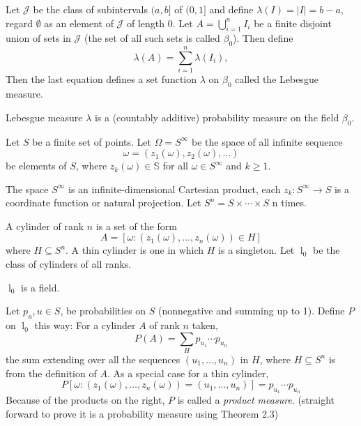 \documentclass[11pt]{article}
\renewcommand{\S}{\mathbb{S}}
\newcommand{\B}{\beta}
\newcommand{\J}{\mathcal{J}}
\newcommand{\lc}{\mathop l}
\newcommand{\seq}{\subseteq}
\newcommand{\om}{\omega}
\newcommand{\Om}{\Omega}
\newcommand{\es}{\emptyset}
\newenvironment{theorem}[2][Theorem]{\begin{trivlist}
\item[\hskip \labelsep {\bfseries #1}\hskip \labelsep {\bfseries #2.}]}{\end{trivlist}}
\newenvironment{definition}[2][Definition]{\begin{trivlist}
\item[\hskip \labelsep {\bfseries #1}\hskip \labelsep {\bfseries #2.}]}{\end{trivlist}}
\newenvironment{rmrk}[2][Remark]{\begin{trivlist}
\item[\hskip \labelsep {\bfseries #1}\hskip \labelsep {\bfseries #2.}]}{\end{trivlist}}
\begin{document}
\begin{definition}{12}
    Let $\J$ be the class of subintervals $(a, b]$ of $(0, 1]$ and define $\lambda (I) = |I| = b - a$, regard $\es$ as an element of $\J$ of length $0$. Let $A = \bigcup_{i=1}^{n} I_i$ be a finite disjoint union of sets in $\J$ (the set of all such sets is called $\B_0$). Then define \[ \lambda (A) = \sum_{i=1}^{n} \lambda(I_i), \]
    Then the last equation defines a set function $\lambda$ on $\B_0$ called the Lebesgue measure.
\end{definition}

\begin{theorem}{2.2}
    Lebesgue measure $\lambda$ is a (countably additive) probability measure on the field $\B_0$.
\end{theorem}

\begin{definition}{13}
    Let $S$ be a finite set of points. Let $\Om = S^{\infty}$ be the space of all infinite sequence
    \[ \om = (z_1 (\om), z_2 (\om), \ldots) \]
    be elements of $S$, where $z_k (\om) \in \S$ for all $\om \in S^{\infty}$ and $k \geq 1$.
\end{definition}

\begin{rmrk}{14}
    The space $S^{\infty}$ is an infinite-dimensional Cartesian product, each $z_k: S^{\infty} \to S$ is a coordinate function or natural projection. Let $S^{n} = S \times \cdots \times S$ n times.
\end{rmrk}

\begin{definition}{15}
    A cylinder of rank $n$ is a set of the form
    \[ A = [ \om : (z_1 (\om), \ldots, z_n (\om)) \in H] \]
    where $H \seq S^n$. A thin cylinder is one in which $H$ is a singleton. Let $\lc_0$ be the class of cylinders of all ranks.
\end{definition}

\begin{rmrk}{16}
    $\lc_0$ is a field.
\end{rmrk}


\begin{definition}{17}
    Let $p_u, u \in S$, be probabilities on $S$ (nonnegative and summing up to 1). Define $P$ on $\lc_0$ this way: For a cylinder $A$ of rank $n$ taken,
    \[ P(A) = \sum_{H} p_{u_1} \cdots p_{u_n} \]
    the sum extending over all the sequences $(u_1, \ldots, u_n)$ in $H$, where $H \seq S^n$ is from the definition of $A$. As a special case for a thin cylinder,
    \[ P[\om : (z_1 (\om), \ldots, z_n (\om)) = (u_1, \ldots, u_n)] = p_{u_1} \cdots p_{u_n} \]
    Because of the products on the right, $P$ is called a \emph{product measure}. (straight forward to prove it is a probability measure using Theorem 2.3)
\end{definition}
\end{document}
